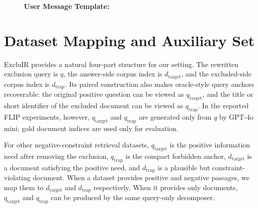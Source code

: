 \documentclass[11pt]{article}
\newcommand{\method}{FLIP\xspace}
\begin{document}
\begin{figure}[p]
{\begin{minipage}{0.96\linewidth}
\begin{minipage}{0.94\linewidth}

\textbf{User Message Template:}

\end{minipage}
\vspace{0.7em}
\end{minipage}}
\endgroup
\end{figure}

\clearpage
\section{Dataset Mapping and Auxiliary Set}
\label{sec:appendix-dataset-mapping}

ExcluIR provides a natural four-part structure for our setting.
The rewritten exclusion query is $q$, the answer-side corpus index is $d_{\mathrm{target}}$, and the excluded-side corpus index is $d_{\mathrm{trap}}$.
Its paired construction also makes oracle-style query anchors recoverable: the original positive question can be viewed as $q_{\mathrm{target}}$, and the title or short identifier of the excluded document can be viewed as $q_{\mathrm{trap}}$.
In the reported \method experiments, however, $q_{\mathrm{target}}$ and $q_{\mathrm{trap}}$ are generated only from $q$ by GPT-4o mini; gold document indices are used only for evaluation.

For other negative-constraint retrieval datasets, $q_{\mathrm{target}}$ is the positive information need after removing the exclusion, $q_{\mathrm{trap}}$ is the compact forbidden anchor, $d_{\mathrm{target}}$ is a document satisfying the positive need, and $d_{\mathrm{trap}}$ is a plausible but constraint-violating document.
When a dataset provides positive and negative passages, we map them to $d_{\mathrm{target}}$ and $d_{\mathrm{trap}}$ respectively.
When it provides only documents, $q_{\mathrm{target}}$ and $q_{\mathrm{trap}}$ can be produced by the same query-only decomposer.
\end{document}
